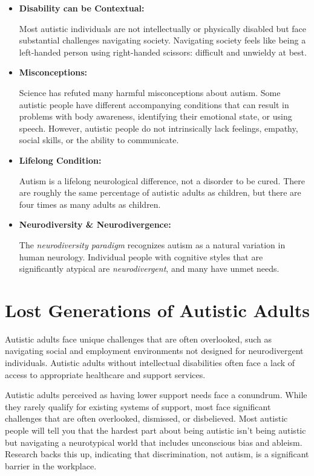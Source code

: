 \documentclass[
  letterpaper,
  DIV=11,
  numbers=noendperiod]{scrreprt}
\begin{document}
\begin{itemize}
\item
  \textbf{Disability can be Contextual:}

  Most autistic individuals are not intellectually or physically
  disabled but face substantial challenges navigating society.
  Navigating society feels like being a left-handed person using
  right-handed scissors: difficult and unwieldy at best.
\item
  \textbf{Misconceptions:}

  Science has refuted many harmful misconceptions about autism. Some
  autistic people have different accompanying conditions that can result
  in problems with body awareness, identifying their emotional state, or
  using speech. However, autistic people do not intrinsically lack
  feelings, empathy, social skills, or the ability to communicate.
\item
  \textbf{Lifelong Condition:}

  Autism is a lifelong neurological difference, not a disorder to be
  cured. There are roughly the same percentage of autistic adults as
  children, but there are four times as many adults as children.
\item
  \textbf{Neurodiversity \& Neurodivergence:}

  The \emph{neurodiversity paradigm} recognizes autism as a natural
  variation in human neurology. Individual people with cognitive styles
  that are significantly atypical are \emph{neurodivergent}, and many
  have unmet needs.
\end{itemize}

\hypertarget{sec-autism2024_lost_gen}{%
\section{Lost Generations of Autistic
Adults}\label{sec-autism2024_lost_gen}}

Autistic adults face unique challenges that are often overlooked, such
as navigating social and employment environments not designed for
neurodivergent individuals. Autistic adults without intellectual
disabilities often face a lack of access to appropriate healthcare and
support services.

Autistic adults perceived as having lower support needs face a
conundrum. While they rarely qualify for existing systems of support,
most face significant challenges that are often overlooked, dismissed,
or disbelieved. Most autistic people will tell you that the hardest part
about being autistic isn't being autistic but navigating a neurotypical
world that includes unconscious bias and ableism. Research backs this
up, indicating that discrimination, not autism, is a significant barrier
in the workplace.
\end{document}

